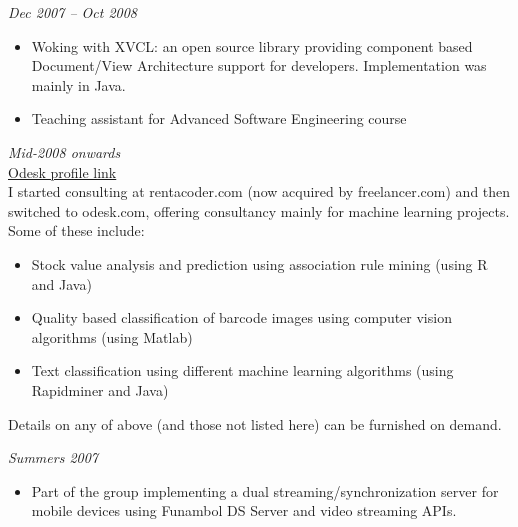 \documentclass[margin, 10pt]{res} %
\begin{document}
\begin{resume}
{\sl \textbf{}} \hfill \textit{Dec 2007 -- Oct 2008} \\
{\color{RubineRed}{Computer Science Department, LUMS, Pakistan}} 
\begin{itemize} 
\item Woking with XVCL: an open source library providing component based Document/View Architecture support for developers. Implementation was mainly in Java.
\item Teaching assistant for Advanced Software Engineering course
\end{itemize} 

{\sl \textbf{}} \hfill \textit{Mid-2008 onwards} \\
{\color{RubineRed}{Odesk Corporation} \hfill \href{https://www.odesk.com/users/~013a228837c241737c}{Odesk profile link}} \\
I started consulting at rentacoder.com (now acquired by freelancer.com) and then switched to odesk.com, offering consultancy mainly for machine learning projects. Some of these include: 

\begin{itemize} \itemsep -2pt %
\item Stock value analysis and prediction using association rule mining (using R and Java)
\item Quality based classification of barcode images using computer vision algorithms (using Matlab)
\item Text classification using different machine learning algorithms (using Rapidminer and Java) 
\end{itemize} 
Details on any of above (and those not listed here) can be furnished on demand.

{\sl \textbf{}} \hfill \textit{Summers 2007} \\
{\color{RubineRed}{Five Rivers Technologies, Lahore}}
\begin{itemize}
\item Part of the group implementing a dual streaming/synchronization server for mobile devices using Funambol DS Server and video streaming APIs.
\end{itemize} 



\end{resume}
\end{document}
